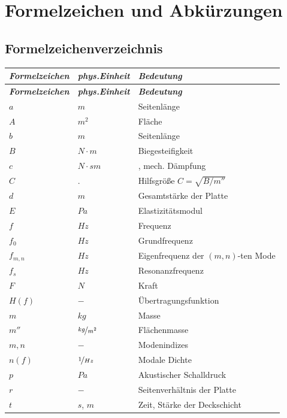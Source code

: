 \chapter*{Formelzeichen und Abk\"urzungen}

\section*{Formelzeichenverzeichnis}
\enlargethispage{-4cm}

\renewcommand{\arraystretch}{1.3}
\setlength{\tabcolsep}{30pt}
\begin{longtable}[l]{l l l}
\bfseries \emph{Formelzeichen}& \bfseries \emph{phys.Einheit} &\bfseries \emph{Bedeutung}\\
\endfirsthead
\bfseries \emph{Formelzeichen}& \bfseries \emph{phys.Einheit} &\bfseries \emph{Bedeutung}\\
\endhead
$a$	& $m$	&Seitenlänge\\
$A$ & $m^2$ & Fläche\\
$b$ & $m$ & Seitenlänge\\
$B$ & ${N \cdot m}$ &Biegesteifigkeit\\
$c$ & ${N \cdot s}{m}$ &, mech. Dämpfung\\
$C$ & $.$ & Hilfsgröße $C = \sqrt{B/m''}$\\
$d$ & $m$ & Gesamtstärke der Platte\\
$E$ & $Pa$ & Elastizitätsmodul\\
$f$ & $Hz$ & Frequenz\\
$f_0$ & $Hz$ & Grundfrequenz\\
$f_{m,n}$ & $Hz$ & Eigenfrequenz der $(m,n)$-ten Mode\\
$f_s$ & $Hz$ & Resonanzfrequenz\\
$F$ & $N$&	Kraft\\
$H(f)$ & $-$ & Übertragungsfunktion\\

$m$	& $kg$&	Masse\\
$m''$ & $\nicefrac{kg}{m^2}$ & Flächenmasse\\
$m, n$ & $-$ & Modenindizes\\

$n(f)$ & $\nicefrac{1}{Hz}$ & Modale Dichte\\
$p$ & $Pa$ & Akustischer Schalldruck\\

$r$ & $-$ & Seitenverhältnis der Platte\\

$t$ & $s$, $m$ & Zeit, Stärke der Deckschicht\\

\end{longtable}

